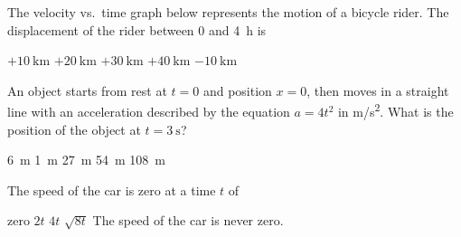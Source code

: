 \documentclass{../../../oss-classkick-exam}
\begin{document}
\begin{multicols*}{2}
\begin{questions}
    \question The velocity vs.\ time graph below represents the motion of a
    bicycle rider. The displacement of the rider between $0$ and \SI{4}{\hour}
    is
    \begin{center}
    \end{center}
    \begin{choices}
      \choice $+\SI{10}{\kilo\metre}$
      \choice $+\SI{20}{\kilo\metre}$
      \choice $+\SI{30}{\kilo\metre}$
      \choice $+\SI{40}{\kilo\metre}$
      \choice $-\SI{10}{\kilo\metre}$
    \end{choices}

    \question An object starts from rest at $t=0$ and position $x=0$, then moves
    in a straight line with an acceleration described by the equation $a=4t^2$
    in \si{m/s^2}. What is the position of the object at $t=\SI{3}{\second}$?
    \begin{choices}
      \choice\SI{6}{\metre}
      \choice\SI{1}{\metre}
      \choice\SI{27}{\metre}
      \choice\SI{54}{\metre}
      \choice\SI{108}{\metre}
    \end{choices}
    \columnbreak
    

    \question The speed of the car is zero at a time $t$ of
    \begin{choices}
      \choice zero
      \choice $2t$
      \choice $4t$
      \choice $\sqrt{8t}$
      \choice The speed of the car is never zero.
    \end{choices}
    \vspace{.65in}
    \label{car1}
    

\end{questions}
\end{multicols*}
\end{document}
